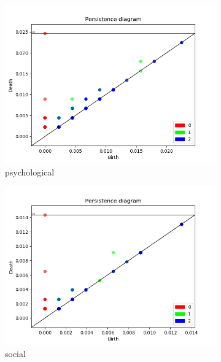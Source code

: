 \documentclass[fleqn]{article}
\begin{document}
\begin{figure}
\begin{subfigure}[t]{0.425\textwidth}
    	\includegraphics[width=\textwidth]{figures/all_words/psychological.png}
    	\caption{psychological}
        \label{fig:all:psychological}
    \end{subfigure}\hfill
	\begin{subfigure}[t]{0.425\textwidth}
    	\includegraphics[width=\textwidth]{figures/all_words/social.png}
    	\caption{social}
        \label{fig:all:social}
    \end{subfigure}\hfill
    \\
	\begin{subfigure}[t]{0.425\textwidth}

\end{subfigure}
\end{figure}
\end{document}
